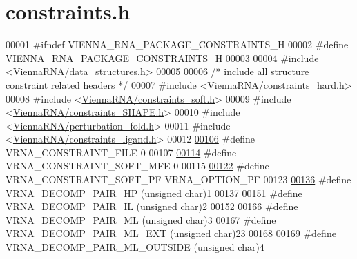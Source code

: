 \hypertarget{constraints_8h_source}{}\section{constraints.\+h}
\label{constraints_8h_source}

\begin{DoxyCode}
00001 \textcolor{preprocessor}{#ifndef VIENNA\_RNA\_PACKAGE\_CONSTRAINTS\_H}
00002 \textcolor{preprocessor}{#define VIENNA\_RNA\_PACKAGE\_CONSTRAINTS\_H}
00003 
00004 \textcolor{preprocessor}{#include <\hyperlink{data__structures_8h}{ViennaRNA/data\_structures.h}>}
00005 
00006 \textcolor{comment}{/* include all structure constraint related headers */}
00007 \textcolor{preprocessor}{#include <\hyperlink{constraints__hard_8h}{ViennaRNA/constraints\_hard.h}>}
00008 \textcolor{preprocessor}{#include <\hyperlink{constraints__soft_8h}{ViennaRNA/constraints\_soft.h}>}
00009 \textcolor{preprocessor}{#include <\hyperlink{constraints__SHAPE_8h}{ViennaRNA/constraints\_SHAPE.h}>}
00010 \textcolor{preprocessor}{#include <\hyperlink{perturbation__fold_8h}{ViennaRNA/perturbation\_fold.h}>}
00011 \textcolor{preprocessor}{#include <\hyperlink{constraints__ligand_8h}{ViennaRNA/constraints\_ligand.h}>}
00012 
\hyperlink{group__constraints_ga62e0ed0c33002c09423de4e646f85a2b}{00106} \textcolor{preprocessor}{#define VRNA\_CONSTRAINT\_FILE      0}
00107 
\hyperlink{group__constraints_ga62aa195893d02d1a79ca94952748df36}{00114} \textcolor{preprocessor}{#define VRNA\_CONSTRAINT\_SOFT\_MFE  0}
00115 
\hyperlink{group__constraints_ga03fb5000c19b9a2082bf4ea30a543045}{00122} \textcolor{preprocessor}{#define VRNA\_CONSTRAINT\_SOFT\_PF   VRNA\_OPTION\_PF}
00123 
\hyperlink{group__constraints_ga8bd41ebc8039378d242e4e8c273716a5}{00136} \textcolor{preprocessor}{#define VRNA\_DECOMP\_PAIR\_HP     (unsigned char)1}
00137 
\hyperlink{group__constraints_gaeab04f34d7730cff2d651d782f95d857}{00151} \textcolor{preprocessor}{#define VRNA\_DECOMP\_PAIR\_IL     (unsigned char)2}
00152 
\hyperlink{group__constraints_gaa15b1185673f0b9e900c4748d45f388f}{00166} \textcolor{preprocessor}{#define VRNA\_DECOMP\_PAIR\_ML     (unsigned char)3}
00167 \textcolor{preprocessor}{#define VRNA\_DECOMP\_PAIR\_ML\_EXT     (unsigned char)23}
00168 
00169 \textcolor{preprocessor}{#define VRNA\_DECOMP\_PAIR\_ML\_OUTSIDE     (unsigned char)4}

\end{DoxyCode}
